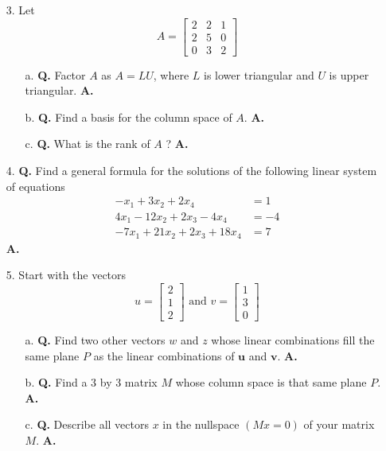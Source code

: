\documentclass[main.tex]{subfiles}
\begin{document}
\begin{enumerate}
\item[3.] Let
$$
A=\left[\begin{array}{lll}
2 & 2 & 1 \\
2 & 5 & 0 \\
0 & 3 & 2
\end{array}\right]
$$
\begin{enumerate}
    \item [a.] \textbf{Q.} Factor $A$ as $A=L U$, where $L$ is lower triangular and $U$ is upper triangular. \textbf{A.} 
    \item [b.] \textbf{Q.} Find a basis for the column space of $A$. \textbf{A.}
    \item [c.] \textbf{Q.} What is the rank of $A$ ? \textbf{A.}
\end{enumerate}

\item[4.] \textbf{Q.} Find a general formula for the solutions of the following linear system of equations
$$
\begin{aligned}
-x_1 + 3x_2 + 2x_4 & = 1\\
4x_1 - 12x_2 + 2x_3 -4x_4 &= -4\\
-7x_1 +21x_2 + 2x_3 + 18x_4 &= 7
\end{aligned}
$$
\textbf{A.}

\item[5.] Start with the vectors
$$
u=\left[\begin{array}{l}
2 \\
1 \\
2
\end{array}\right] \text { and } v=\left[\begin{array}{l}
1 \\
3 \\
0
\end{array}\right]
$$
\begin{enumerate}
    \item [a.] \textbf{Q.} Find two other vectors $w$ and $z$ whose linear combinations fill the same plane $P$ as the linear combinations of $\boldsymbol{u}$ and $\boldsymbol{v}$. \textbf{A.}
    
    \item [b.] \textbf{Q.} Find a 3 by 3 matrix $M$ whose column space is that same plane $P$. \textbf{A.}
    
    \item [c.] \textbf{Q.} Describe all vectors $x$ in the nullspace $(M x=0)$ of your matrix $M$. \textbf{A.}
\end{enumerate}


\end{enumerate}
\end{document}
